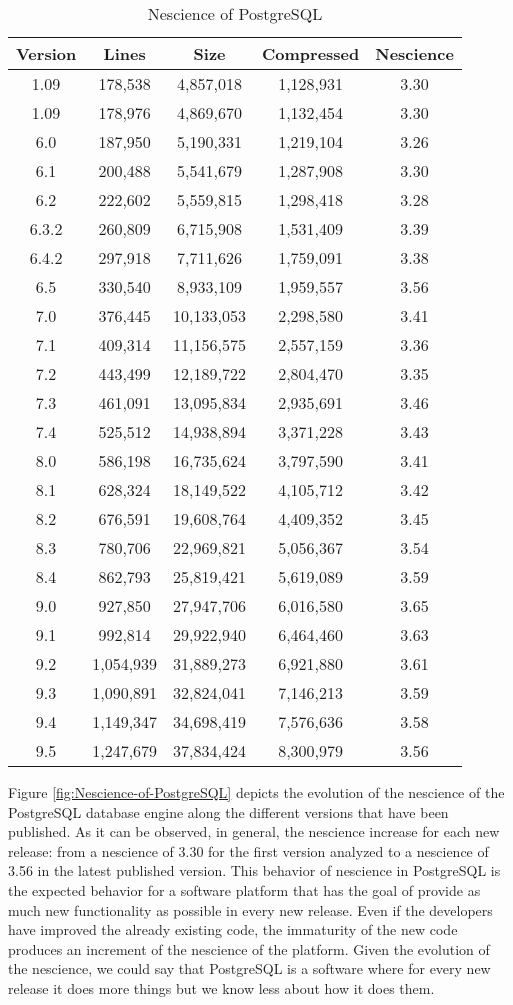 \begin{table}
\begin{centering}
\begin{tabular}{|c|c|c|c|c|}
\hline 
Version & Lines & Size & Compressed & Nescience\tabularnewline
\hline
\hline
1.09 & 178,538 & 4,857,018 & 1,128,931 & 3.30 \tabularnewline
\hline
1.09 & 178,976 & 4,869,670 & 1,132,454 & 3.30 \tabularnewline
\hline
6.0 & 187,950 & 5,190,331 & 1,219,104 & 3.26 \tabularnewline
\hline
6.1 & 200,488 & 5,541,679 & 1,287,908 & 3.30 \tabularnewline
\hline
6.2 & 222,602 & 5,559,815 & 1,298,418 & 3.28 \tabularnewline
\hline
6.3.2 & 260,809 & 6,715,908 & 1,531,409 & 3.39 \tabularnewline
\hline
6.4.2 & 297,918 & 7,711,626 & 1,759,091 & 3.38 \tabularnewline
\hline
6.5 & 330,540 & 8,933,109 & 1,959,557 & 3.56 \tabularnewline
\hline
7.0 & 376,445 & 10,133,053 & 2,298,580 & 3.41 \tabularnewline
\hline
7.1 & 409,314 & 11,156,575 & 2,557,159 & 3.36 \tabularnewline
\hline
7.2 & 443,499 & 12,189,722 & 2,804,470 & 3.35 \tabularnewline
\hline
7.3 & 461,091 & 13,095,834 & 2,935,691 & 3.46 \tabularnewline
\hline
7.4 & 525,512 & 14,938,894 & 3,371,228 & 3.43 \tabularnewline
\hline
8.0 & 586,198 & 16,735,624 & 3,797,590 & 3.41 \tabularnewline
\hline
8.1 & 628,324 & 18,149,522 & 4,105,712 & 3.42 \tabularnewline
\hline
8.2 & 676,591 & 19,608,764 & 4,409,352 & 3.45 \tabularnewline
\hline
8.3 & 780,706 & 22,969,821 & 5,056,367 & 3.54 \tabularnewline
\hline
8.4 & 862,793 & 25,819,421 & 5,619,089 & 3.59 \tabularnewline
\hline
9.0 & 927,850 & 27,947,706 & 6,016,580 & 3.65 \tabularnewline
\hline
9.1 & 992,814 & 29,922,940 & 6,464,460 & 3.63 \tabularnewline
\hline
9.2 & 1,054,939 & 31,889,273 & 6,921,880 & 3.61 \tabularnewline
\hline
9.3 & 1,090,891 & 32,824,041 & 7,146,213 & 3.59 \tabularnewline
\hline
9.4 & 1,149,347 & 34,698,419 & 7,576,636 & 3.58 \tabularnewline
\hline
9.5 & 1,247,679 & 37,834,424 & 8,300,979 & 3.56 \tabularnewline
\hline
\end{tabular}
\par\end{centering}
\caption{\label{tab:Nescience-PostgreSQL}Nescience of PostgreSQL}
\end{table}

Figure \ref{fig:Nescience-of-PostgreSQL} depicts the evolution of the nescience of the PostgreSQL database engine along the different versions that have been published. As it can be observed, in general, the nescience increase for each new release: from a nescience of 3.30 for the first version analyzed to a nescience of 3.56 in the latest published version. This behavior of nescience in PostgreSQL is the expected behavior for a software platform that has the goal of provide as much new functionality as possible in every new release. Even if the developers have improved the already existing code, the immaturity of the new code produces an increment of the nescience of the platform. Given the evolution of the nescience, we could say that PostgreSQL is a software where for every new release it does more things but we know less about how it does them.

